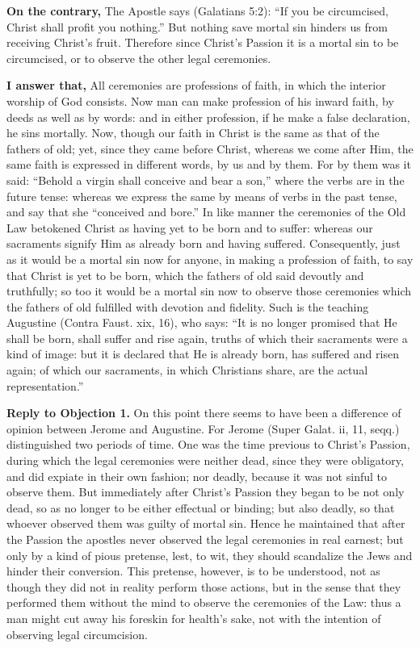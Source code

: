 \textbf{On the contrary,} The Apostle says (Galatians 5:2): ``If you be circumcised, Christ shall profit you nothing.'' But nothing save mortal sin hinders us from receiving Christ's fruit. Therefore since Christ's Passion it is a mortal sin to be circumcised, or to observe the other legal ceremonies.

\textbf{I answer that,} All ceremonies are professions of faith, in which the interior worship of God consists. Now man can make profession of his inward faith, by deeds as well as by words: and in either profession, if he make a false declaration, he sins mortally. Now, though our faith in Christ is the same as that of the fathers of old; yet, since they came before Christ, whereas we come after Him, the same faith is expressed in different words, by us and by them. For by them was it said: ``Behold a virgin shall conceive and bear a son,'' where the verbs are in the future tense: whereas we express the same by means of verbs in the past tense, and say that she ``conceived and bore.'' In like manner the ceremonies of the Old Law betokened Christ as having yet to be born and to suffer: whereas our sacraments signify Him as already born and having suffered. Consequently, just as it would be a mortal sin now for anyone, in making a profession of faith, to say that Christ is yet to be born, which the fathers of old said devoutly and truthfully; so too it would be a mortal sin now to observe those ceremonies which the fathers of old fulfilled with devotion and fidelity. Such is the teaching Augustine (Contra Faust. xix, 16), who says: ``It is no longer promised that He shall be born, shall suffer and rise again, truths of which their sacraments were a kind of image: but it is declared that He is already born, has suffered and risen again; of which our sacraments, in which Christians share, are the actual representation.''

\textbf{Reply to Objection 1.} On this point there seems to have been a difference of opinion between Jerome and Augustine. For Jerome (Super Galat. ii, 11, seqq.) distinguished two periods of time. One was the time previous to Christ's Passion, during which the legal ceremonies were neither dead, since they were obligatory, and did expiate in their own fashion; nor deadly, because it was not sinful to observe them. But immediately after Christ's Passion they began to be not only dead, so as no longer to be either effectual or binding; but also deadly, so that whoever observed them was guilty of mortal sin. Hence he maintained that after the Passion the apostles never observed the legal ceremonies in real earnest; but only by a kind of pious pretense, lest, to wit, they should scandalize the Jews and hinder their conversion. This pretense, however, is to be understood, not as though they did not in reality perform those actions, but in the sense that they performed them without the mind to observe the ceremonies of the Law: thus a man might cut away his foreskin for health's sake, not with the intention of observing legal circumcision.

